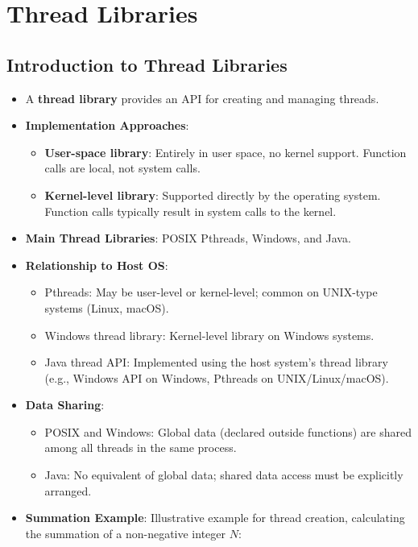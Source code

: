 \section{Thread Libraries}\label{sec:4.4}

\subsection{Introduction to Thread Libraries}
\begin{itemize}
    \item A \textbf{thread library} provides an API for creating and managing threads.
    \item \textbf{Implementation Approaches}:
        \begin{itemize}
            \item \textbf{User-space library}: Entirely in user space, no kernel support. Function calls are local, not system calls.
            \item \textbf{Kernel-level library}: Supported directly by the operating system. Function calls typically result in system calls to the kernel.
        \end{itemize}
    \item \textbf{Main Thread Libraries}: POSIX Pthreads, Windows, and Java.
    \item \textbf{Relationship to Host OS}:
        \begin{itemize}
            \item Pthreads: May be user-level or kernel-level; common on UNIX-type systems (Linux, macOS).
            \item Windows thread library: Kernel-level library on Windows systems.
            \item Java thread API: Implemented using the host system's thread library (e.g., Windows API on Windows, Pthreads on UNIX/Linux/macOS).
        \end{itemize}
    \item \textbf{Data Sharing}:
        \begin{itemize}
            \item POSIX and Windows: Global data (declared outside functions) are shared among all threads in the same process.
            \item Java: No equivalent of global data; shared data access must be explicitly arranged.
        \end{itemize}
    \item \textbf{Summation Example}: Illustrative example for thread creation, calculating the summation of a non-negative integer $N$:

\end{itemize}
